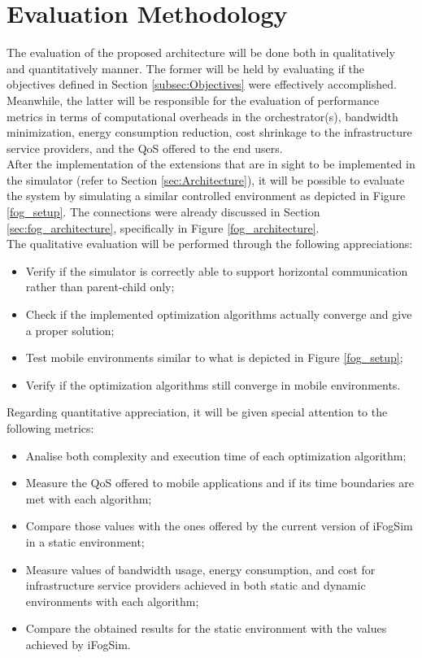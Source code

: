 \section{Evaluation Methodology}
\label{sec:Evaluation}
The evaluation of the proposed architecture will be done both in qualitatively and quantitatively manner. The former will be held by evaluating if the objectives defined in Section \ref{subsec:Objectives} were effectively accomplished. Meanwhile, the latter will be responsible for the evaluation of performance metrics in terms of computational overheads in the orchestrator(s), bandwidth minimization, energy consumption reduction, cost shrinkage to the infrastructure service providers, and the QoS offered to the end users.\\[6pt]
After the implementation of the extensions that are in sight to be implemented in the simulator (refer to Section \ref{sec:Architecture}), it will be possible to evaluate the system by simulating a similar controlled environment as depicted in Figure \ref{fog_setup}. The connections were already discussed in Section \ref{sec:fog_architecture}, specifically in Figure \ref{fog_architecture}.\\[6pt]
The qualitative evaluation will be performed through the following appreciations:
\begin{itemize}
	\item Verify if the simulator is correctly able to support horizontal communication rather than parent-child only;
	\item Check if the implemented optimization algorithms actually converge and give a proper solution;
	\item Test mobile environments similar to what is depicted in Figure \ref{fog_setup};
	\item Verify if the optimization algorithms still converge in mobile environments.
\end{itemize}
Regarding quantitative appreciation, it will be given special attention to the following metrics:
\begin{itemize}
	\item Analise both complexity and execution time of each optimization algorithm;
	\item Measure the QoS offered to mobile applications and if its time boundaries are met with each algorithm;
	\item Compare those values with the ones offered by the current version of iFogSim in a static environment;
	\item Measure values of bandwidth usage, energy consumption, and cost for infrastructure service providers achieved in both static and dynamic environments with each algorithm;
	\item Compare the obtained results for the static environment with the values achieved by iFogSim.
\end{itemize}

